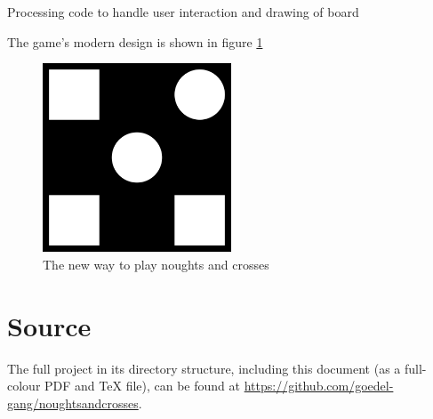 \documentclass[a4paper,11pt]{article}
\newenvironment{longlisting}
{\addvspace{\baselineskip}\captionsetup{type=listing}}
{\addvspace{\baselineskip}}
\begin{document}
\begin{longlisting}
\inputminted{python}{../noughtsandcrosses.pyde}
\caption{Processing code to handle user interaction and drawing of board}\label{lst:procpy}
\end{longlisting}

    The game's modern design is shown in figure \ref{fig:proc}

\begin{figure}[H]
\begin{center}
\includegraphics[width=0.5\textwidth]{../win_screenshot_20180712_110639.png}
\caption{The new way to play noughts and crosses}\label{fig:proc}
\end{center}
\end{figure}

    \section{Source}

    The full project in its directory structure, including this document (as a
    full-colour PDF and \TeX{} file), can be found at
    \url{https://github.com/goedel-gang/noughtsandcrosses}.
\end{document}

